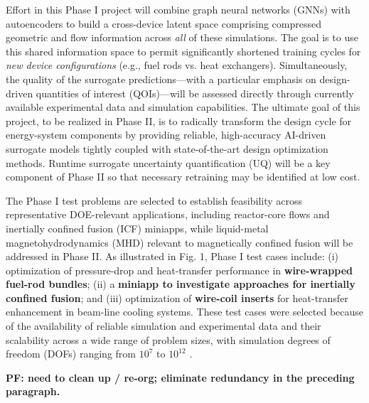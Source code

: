   Effort in this Phase I project will combine graph neural networks (GNNs) with
autoencoders to build a cross-device latent space comprising compressed
geometric and flow information across {\em all} of these simulations.  The goal
is to use this shared information space to permit significantly shortened
training cycles for {\em new device configurations} (e.g., fuel rods vs. heat
exchangers).  Simultaneously, the quality of the surrogate predictions---with a 
particular emphasis on design-driven quantities of interest (QOIs)---will be
assessed directly through currently available experimental data and simulation
capabilities.  The ultimate goal of this project, to be realized in Phase II,
is to radically transform the design cycle for energy-system components by
providing reliable, high-accuracy AI-driven surrogate models tightly coupled
with state-of-the-art design optimization methods.  Runtime surrogate
uncertainty quantification (UQ) will be a key component of Phase II so that
necessary retraining may be identified at low cost.

The Phase I test problems are selected to establish feasibility across
representative DOE-relevant applications, including reactor-core flows and
inertially confined fusion (ICF) miniapps, while liquid-metal
magnetohydrodynamics (MHD) relevant to magnetically confined fusion will be
addressed in Phase II.
As illustrated in Fig. 1, Phase I test cases include:
    (i) optimization of pressure-drop and heat-transfer performance in \textbf{wire-wrapped fuel-rod bundles};
   (ii) a \textbf{miniapp to investigate approaches for inertially confined fusion}; and
  (iii) optimization of \textbf{wire-coil inserts} for
heat-transfer enhancement in beam-line cooling systems.
These test cases were selected because of the availability of reliable simulation
and experimental data and their scalability across a wide range of problem sizes,
with simulation degrees of freedom (DOFs) ranging from $10^7$ to $10^{12}$
\cite{gb23,gb25mfem}.

{\bf PF: need to clean up / re-org; eliminate redundancy in the preceding paragraph.}

